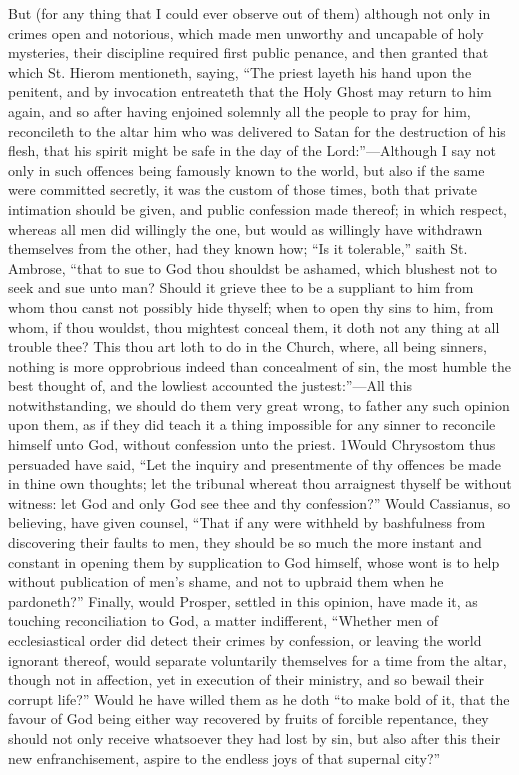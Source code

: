 But (for any thing that I could ever observe out of them) although not only in crimes open and notorious, which made men unworthy and uncapable of holy mysteries, their discipline required first public penance, and then granted that which St. Hierom mentioneth, saying, “The priest layeth his hand upon the penitent, and by invocation entreateth that the Holy Ghost may return to him again, and so after having enjoined solemnly all the people to pray for him, reconcileth to the altar him who was delivered to Satan for the destruction of his flesh, that his spirit might be safe in the day of the Lord:”—Although I say not only in such offences being famously known to the world, but also if the same were committed secretly, it was the custom of those times, both that private intimation should be given, and public confession made thereof; in which respect, whereas all men did willingly the one, but would as willingly have withdrawn themselves from the other, had they known how; “Is it tolerable,” saith St. Ambrose, “that to sue to God thou shouldst be ashamed, which blushest not to seek and sue unto man? Should it grieve thee to be a suppliant to him from whom thou canst not possibly hide thyself; when to open thy sins to him, from whom, if thou wouldst, thou  mightest conceal them, it doth not any thing at all trouble thee? This thou art loth to do in the Church, where, all being sinners, nothing is more opprobrious indeed than concealment of sin, the most humble the best thought of, and the lowliest accounted the justest:”—All this notwithstanding, we should do them very great wrong, to father any such opinion upon them, as if they did teach it a thing impossible for any sinner to reconcile himself unto God, without confession unto the priest. 1Would Chrysostom thus persuaded have said, “Let the inquiry and presentmente of thy offences be made in thine own thoughts; let the tribunal whereat thou arraignest thyself be without witness: let God and only God see thee and thy confession?” Would Cassianus, so believing, have given counsel, “That if any were withheld by bashfulness from discovering their faults to men, they should be so much the more instant and constant in opening them by supplication to God himself, whose wont is to help without publication of men’s shame, and not to upbraid them when he pardoneth?” Finally, would Prosper, settled in this opinion, have made it, as touching reconciliation to God, a matter indifferent, “Whether men of ecclesiastical order did detect their crimes by confession, or leaving the world ignorant thereof, would separate voluntarily themselves for a time from the altar, though not in affection, yet in execution of their ministry, and so bewail their corrupt life?” Would he have willed them as he doth “to make bold of it, that the favour of God being either way recovered by fruits  of forcible repentance, they should not only receive whatsoever they had lost by sin, but also after this their new enfranchisement, aspire to the endless joys of that supernal city?”

